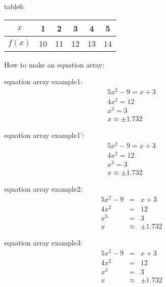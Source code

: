\documentclass[11pt]{article}
\begin{document}
table6:

\begin{tabular}{|c|c|c|c|c|c|}
\hline
$x$ & 1 & 2 & 3 & 4 & 5 \\ \hline
$f(x)$ & 10 & 11 & 12 & 13 &14\\ \hline
\end{tabular}

How to make an equation array:

equation array example1:
\begin{eqnarray}
5x^2-9=x+3\\ 
4x^2=12\\
x^3=3\\
x\approx\pm1.732
\end{eqnarray}

equation array example1':
\begin{eqnarray*}
5x^2-9=x+3\\ 
4x^2=12\\
x^3=3\\
x\approx\pm1.732
\end{eqnarray*}

equation array example2:
\begin{eqnarray}
5x^2-9&=&x+3\\ 
4x^2&=&12\\
x^3&=&3\\
x&\approx&\pm1.732
\end{eqnarray}

equation array example3:
\begin{eqnarray*}
5x^2-9&=&x+3\\ 
4x^2&=&12\\
x^3&=&3\\
x&\approx&\pm1.732
\end{eqnarray*}
\end{document}
